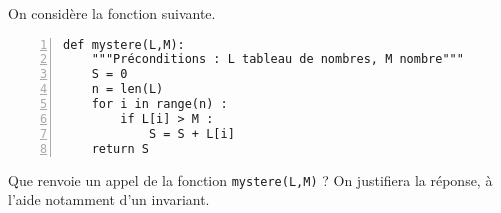 On considère la fonction suivante.
\begin{Verbatim}[gobble=0,numbers=left]
def mystere(L,M):
    """Préconditions : L tableau de nombres, M nombre"""
    S = 0
    n = len(L)
    for i in range(n) : 
        if L[i] > M : 
            S = S + L[i]
    return S
\end{Verbatim}

\bigskip{}

\question{} Que renvoie un appel de la fonction \texttt{mystere(L,M)} ? On justifiera la réponse, à l'aide notamment d'un invariant. 